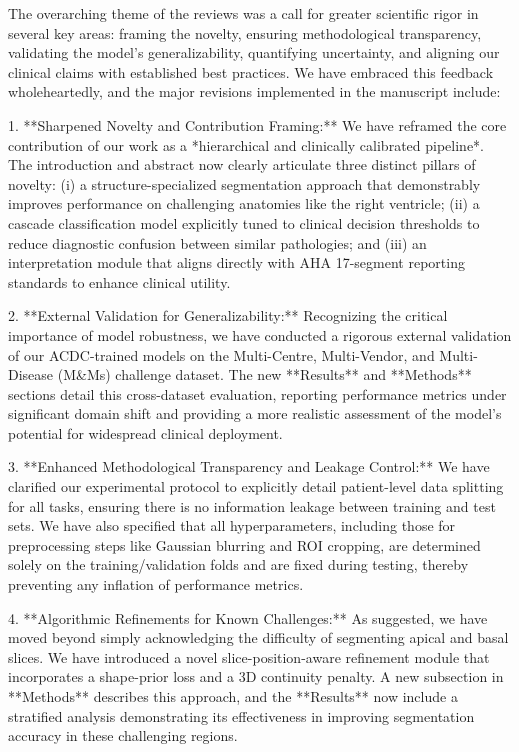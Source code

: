 The overarching theme of the reviews was a call for greater scientific rigor in several key areas: framing the novelty, ensuring methodological transparency, validating the model’s generalizability, quantifying uncertainty, and aligning our clinical claims with established best practices. We have embraced this feedback wholeheartedly, and the major revisions implemented in the manuscript include:

1.  **Sharpened Novelty and Contribution Framing:** We have reframed the core contribution of our work as a *hierarchical and clinically calibrated pipeline*. The introduction and abstract now clearly articulate three distinct pillars of novelty: (i) a structure-specialized segmentation approach that demonstrably improves performance on challenging anatomies like the right ventricle; (ii) a cascade classification model explicitly tuned to clinical decision thresholds to reduce diagnostic confusion between similar pathologies; and (iii) an interpretation module that aligns directly with AHA 17-segment reporting standards to enhance clinical utility.

2.  **External Validation for Generalizability:** Recognizing the critical importance of model robustness, we have conducted a rigorous external validation of our ACDC-trained models on the Multi-Centre, Multi-Vendor, and Multi-Disease (M&Ms) challenge dataset. The new **Results** and **Methods** sections detail this cross-dataset evaluation, reporting performance metrics under significant domain shift and providing a more realistic assessment of the model's potential for widespread clinical deployment.

3.  **Enhanced Methodological Transparency and Leakage Control:** We have clarified our experimental protocol to explicitly detail patient-level data splitting for all tasks, ensuring there is no information leakage between training and test sets. We have also specified that all hyperparameters, including those for preprocessing steps like Gaussian blurring and ROI cropping, are determined solely on the training/validation folds and are fixed during testing, thereby preventing any inflation of performance metrics.

4.  **Algorithmic Refinements for Known Challenges:** As suggested, we have moved beyond simply acknowledging the difficulty of segmenting apical and basal slices. We have introduced a novel slice-position-aware refinement module that incorporates a shape-prior loss and a 3D continuity penalty. A new subsection in **Methods** describes this approach, and the **Results** now include a stratified analysis demonstrating its effectiveness in improving segmentation accuracy in these challenging regions.

